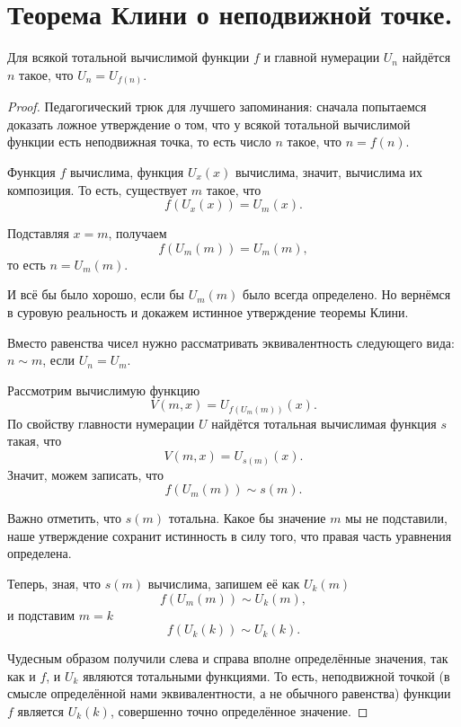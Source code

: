 \section{Теорема Клини о неподвижной точке.}

\begin{theorem}
    Для всякой тотальной вычислимой функции $f$ и главной нумерации $U_n$ найдётся $n$
    такое, что $U_n = U_{f(n)}$.
    \begin{proof}
        Педагогический трюк для лучшего запоминания: сначала попытаемся доказать ложное утверждение
        о том, что у всякой тотальной вычислимой функции есть неподвижная точка, то есть число $n$
        такое, что $n = f(n)$.

        Функция $f$ вычислима, функция $U_x(x)$ вычислима, значит, вычислима их композиция. То
        есть, существует $m$ такое, что
        $$
            f(U_x(x)) = U_m(x).
        $$

        Подставляя $x = m$, получаем
        $$
            f(U_m(m)) = U_m(m),
        $$
        то есть $n = U_m(m)$.

        И всё бы было хорошо, если бы $U_m(m)$ было всегда определено. Но вернёмся в суровую
        реальность и докажем истинное утверждение теоремы Клини.

        Вместо равенства чисел нужно рассматривать эквивалентность следующего вида: $n \sim m$,
        если $U_n = U_m$.

        Рассмотрим вычислимую функцию $$V(m, x) = U_{f(U_m(m))}(x).$$ По свойству главности
        нумерации $U$ найдётся тотальная вычислимая функция $s$ такая, что $$V(m, x)
        = U_{s(m)}(x).$$ Значит, можем записать, что
        $$
            f(U_m(m)) \sim s(m).
        $$

        Важно отметить, что $s(m)$ тотальна. Какое бы значение $m$ мы не подставили, наше
        утверждение сохранит истинность в силу того, что правая часть уравнения определена.

        Теперь, зная, что $s(m)$ вычислима, запишем её как $U_k(m)$
        $$
            f(U_m(m)) \sim U_k(m),
        $$
        и подставим $m = k$
        $$
            f(U_k(k)) \sim U_k(k).
        $$

        Чудесным образом получили слева и справа вполне определённые значения, так как и $f$,
        и $U_k$ являются тотальными функциями. То есть, неподвижной точкой (в смысле
        определённой нами эквивалентности, а не обычного равенства) функции $f$ является
        $U_k(k)$, совершенно точно определённое значение.
    \end{proof}
\end{theorem}
